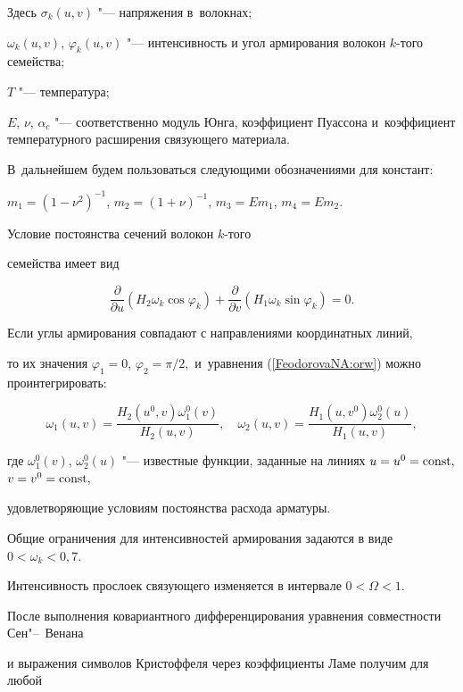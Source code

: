  Здесь $\sigma_{k}(u,v)$  "--- напряжения в~волокнах; 

$\omega_k(u,v)$, $\varphi_k(u,v)$ "--- интенсивность и угол армирования волокон $k$-того семейства; 

$T$ "--- температура; 

$E$, $\nu$, $\alpha_c$ "--- соответственно модуль Юнга, коэффициент Пуассона и~коэффициент температурного расширения связующего материала. 

В~дальнейшем будем пользоваться следующими обозначениями для констант:

$m_1={(1-\nu^2)}^{-1}$, $m_2={(1+\nu)}^{-1}$, $m_3=Em_1$, $m_4=Em_2.$ 

Условие постоянства сечений волокон $k$-того

семейства имеет вид

\begin{equation}

\label{FeodorovaNA:orw} \frac{\partial}{\partial u}(H_2\omega_k

\cos \varphi_k)+\frac{\partial}{\partial v}(H_1\omega_k \sin

\varphi_k)=0.

\end{equation}



Если углы армирования совпадают с направлениями координатных линий,

то их значения $\varphi_1=0$, $\varphi_2={\pi}/{2},$ и~уравнения (\ref{FeodorovaNA:orw}) можно проинтегрировать:

$$\omega_1(u,v)=\frac{H_2(u^0,v)\omega^0_1(v)}{H_2(u,v)},\quad 

\omega_2(u,v)=\frac{H_1(u,v^0)\omega^0_2(u)}{H_1(u,v)},$$ 

где $\omega^0_1(v)$, $\omega^0_2(u)$ "--- известные функции, заданные на линиях $u=u^0=\rm const,$ $v=v^0=\rm const,$ 

удовлетворяющие условиям постоянства расхода арматуры. 

Общие ограничения для интенсивностей армирования задаются в виде \mbox{$0<\omega_k<0,7.$}

Интенсивность прослоек связующего изменяется в интервале $0<\Omega<1.$



 После выполнения ковариантного дифференцирования уравнения совместности Сен"--~Венана \cite{FeodorovaNA:Dem}

 и выражения символов Кристоффеля через коэффициенты Ламе получим для любой

